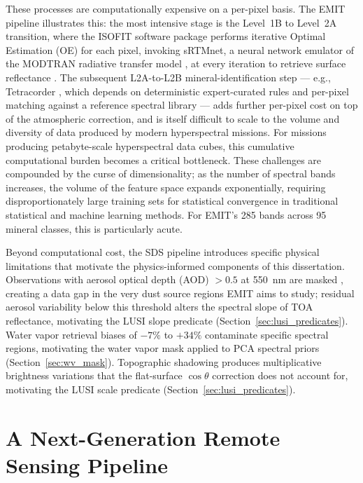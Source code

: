 \documentclass[11pt]{report}
\begin{document}
These processes are computationally expensive on a per-pixel basis. The EMIT pipeline illustrates this: the most intensive stage is the Level~1B to Level~2A transition, where the ISOFIT software package performs iterative Optimal Estimation (OE) for each pixel, invoking sRTMnet, a neural network emulator of the MODTRAN radiative transfer model \cite{brodrick2021}, at every iteration to retrieve surface reflectance \cite{thompson2018, emit_l2a_atbd}. The subsequent L2A-to-L2B mineral-identification step --- e.g., Tetracorder \cite{clark2003tetracorder, clark2024tetracorder}, which depends on deterministic expert-curated rules and per-pixel matching against a reference spectral library --- adds further per-pixel cost on top of the atmospheric correction, and is itself difficult to scale to the volume and diversity of data produced by modern hyperspectral missions.
For missions producing petabyte-scale hyperspectral data cubes, this cumulative computational burden becomes a critical bottleneck.
These challenges are compounded by the curse of dimensionality;
as the number of spectral bands increases, the volume of the feature space expands exponentially, requiring disproportionately large training sets for statistical convergence in traditional statistical and machine learning methods.
For EMIT's 285 bands across 95 mineral classes, this is particularly acute.

Beyond computational cost, the SDS pipeline introduces specific physical limitations that motivate the physics-informed components of this dissertation.
Observations with aerosol optical depth (AOD) $> 0.5$ at 550~nm are masked \cite{emit_l2a_atbd, emit_l3_atbd}, creating a data gap in the very dust source regions EMIT aims to study; residual aerosol variability below this threshold alters the spectral slope of TOA reflectance, motivating the LUSI slope predicate (Section~\ref{sec:lusi_predicates}).
Water vapor retrieval biases of $-7\%$ to $+34\%$ \cite{thompson_emit_2024} contaminate specific spectral regions, motivating the water vapor mask applied to PCA spectral priors (Section~\ref{sec:wv_mask}).
Topographic shadowing produces multiplicative brightness variations that the flat-surface $\cos\theta$ correction does not account for, motivating the LUSI scale predicate (Section~\ref{sec:lusi_predicates}).

\section{A Next-Generation Remote Sensing Pipeline}
\label{sec:rtm_bypass}
\end{document}

